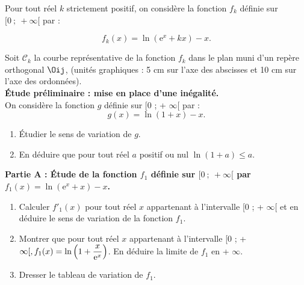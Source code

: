 \begin{exercice}

 Pour tout r\'eel $k$ strictement positif, on consid\`ere la fonction $f_{k}$ d\'efinie 
sur $[0~ ;~ + \infty[$ par : 

\[f_{k}(x) = \ln (\text{e}^x + kx) - x.\] 

\noindent Soit $\mathcal{C}_{k}$ la courbe repr\'esentative 
de la fonction $f_{k}$ dans le plan muni d'un rep\`ere orthogonal 
$\Oij$, (unit\'es graphiques : 5 cm sur l'axe des abscisses et 10 cm sur l'axe des 
ordonn\'ees).\\ 
\textbf{\'Etude pr\'eliminaire : mise en place d'une in\'egalit\'e.}\\ 
On consid\`ere la fonction $g$ d\'efinie sur [0 ; + $\infty$[ par : 
\[g(x) = \ln (1 + x) - x.\] 

\begin{enumerate} \item \'Etudier le sens de variation de $g$. 

\item En d\'eduire que pour tout r\'eel $a$ positif ou nul 
$\ln (1 + a) \leqslant a$. 

\end{enumerate} 

\vspace{0,25cm} 

\noindent \textbf{Partie A : \'Etude de la fonction \boldmath $f_{1}$ 
\unboldmath d\'efinie sur 
\boldmath $[0~;~ + \infty[$ \unboldmath par~ \boldmath $f_{1}(x) = \ln \left(\mathrm{e}^x + x\right) - x$\unboldmath.} 

\begin{enumerate} \item Calculer $f'_{1}(x)$ pour tout r\'eel $x$ appartenant 
\`a l'intervalle [0 ; + $\infty$[ et en d\'eduire le sens de variation de la 
fonction $f_{1}$. 

\item Montrer que pour tout r\'eel $x$ appartenant \`a 
l'intervalle [0 ; + $\infty[,~\\
 f_{1}(x) = \ln \left(1 + 
\dfrac{x}{\text{e}^x}\right)$. En 
d\'eduire la limite de $f_{1}$ en + $\infty$. 

\item Dresser le tableau de variation de $f_{1}$. 

\end{enumerate} 

\vspace{0,25cm} 


\end{exercice}
